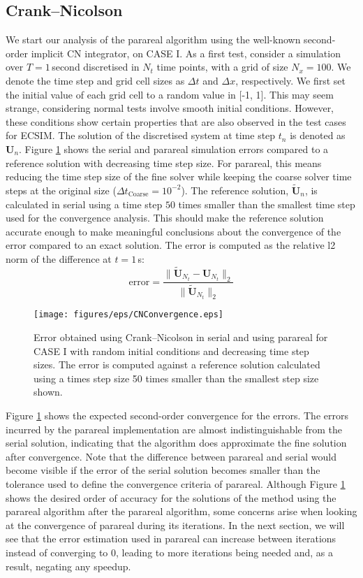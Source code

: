\subsection{Crank--Nicolson}
\label{sec: cn}
We start our analysis of the parareal algorithm using the well-known second-order implicit CN integrator, on CASE I. 
As a first test, consider a simulation over $T = 1$\,second discretised in $N_t$ time points, with a grid of size $N_x = 100$. We denote the time step and grid cell sizes as $\Delta t$ and $\Delta x$, respectively. We first set the initial value of each grid cell to a random value in [-1, 1].  This may seem strange, considering normal tests involve smooth initial conditions. However, these conditions show certain properties that are also observed in the test cases for ECSIM. The solution of the discretised system at time step $t_n$ is denoted as $\textbf{U}_n$. 
Figure \ref{fig: CN-convergence-random} shows the serial and parareal simulation errors compared to a reference solution with decreasing time step size. For parareal, this means reducing the time step size of the fine solver while keeping the coarse solver time steps at the original size ($\Delta t_\mathrm{Coarse}= 10^{-2}$). The reference solution, $\tilde{\textbf{U}}_{n}$, is calculated in serial using a time step $50$ times smaller than the smallest time step used for the convergence analysis. This should make the reference solution accurate enough to make meaningful conclusions about the convergence of the error compared to an exact solution. The error is computed as the relative l2 norm of the difference at $t=1$\,s:
\[\mathrm{error} = \frac{\|\tilde{\textbf{U}}_{N_t} - \textbf{U}_{N_t}\|_2}{\| \tilde{\textbf{U}}_{N_t} \|_2}\]
\begin{figure}[h]
    \centering
    \texttt{[image: figures/eps/CNConvergence.eps]}
    \caption{Error obtained using Crank--Nicolson in serial and using parareal for CASE I with random initial conditions and decreasing time step sizes. The error is computed against a reference solution calculated using a times step size 50 times smaller than the smallest step size shown.}
    \label{fig: CN-convergence-random}
\end{figure}
Figure \ref{fig: CN-convergence-random} shows the expected second-order convergence for the errors. The errors incurred by the parareal implementation are almost indistinguishable from the serial solution, indicating that the algorithm does approximate the fine solution after convergence. Note that the difference between parareal and serial would become visible if the error of the serial solution becomes smaller than the tolerance used to define the convergence criteria of parareal. 
Although Figure \ref{fig: CN-convergence-random} shows the desired order of accuracy for the solutions of the method using the parareal algorithm after the parareal algorithm, some concerns arise when looking at the convergence of parareal during its iterations. In the next section, we will see that the error estimation used in parareal can increase between iterations instead of converging to 0, leading to more iterations being needed and, as a result, negating any speedup.

